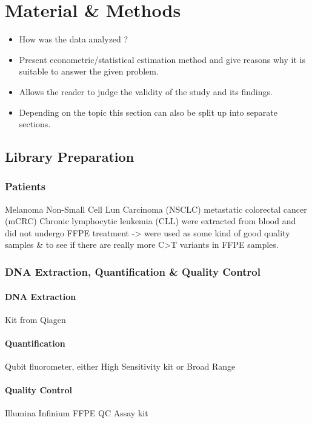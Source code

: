\section{Material & Methods}\label{Sec:Method}

\begin{itemize}

\item How was the data analyzed ?

\item Present econometric/statistical estimation method and
give reasons why it is suitable to answer the given problem.

\item Allows the reader to judge the validity of the study and
its findings.

\item Depending on the topic this section can also be split up
into separate sections.

\end{itemize}

\subsection{Library Preparation}
\subsubsection{Patients}
Melanoma
Non-Small Cell Lun Carcinoma (NSCLC)
metastatic colorectal cancer (mCRC)
Chronic lymphocytic leukemia (CLL) were extracted from blood and did not undergo
FFPE treatment -> were used as some kind of good quality samples & to see if there
are really more C>T variants in FFPE samples.

\subsubsection{DNA Extraction, Quantification & Quality Control}
\paragraph{DNA Extraction}
Kit from Qiagen
\paragraph{Quantification}
Qubit fluorometer, either High Sensitivity kit or Broad Range
\paragraph{Quality Control}
Illumina Infinium FFPE QC Assay kit
